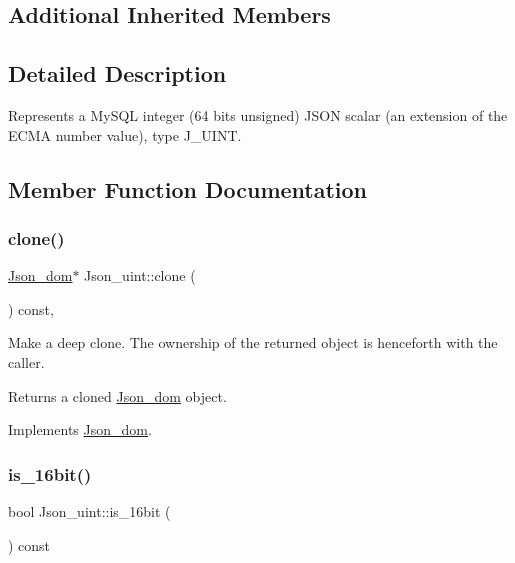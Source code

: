 \subsection*{Additional Inherited Members}


\subsection{Detailed Description}
Represents a My\+S\+QL integer (64 bits unsigned) J\+S\+ON scalar (an extension of the E\+C\+MA number value), type J\+\_\+\+U\+I\+NT. 

\subsection{Member Function Documentation}
\mbox{\label{classJson__uint_acdc931eba3b28293ca6e16d698732d42}} 
\subsubsection{\texorpdfstring{clone()}{clone()}}
{\footnotesize\ttfamily \mbox{\hyperlink{classJson__dom}{Json\+\_\+dom}}$\ast$ Json\+\_\+uint\+::clone (\begin{DoxyParamCaption}{ }\end{DoxyParamCaption}) const\hspace{0.3cm}{\ttfamily [inline]}, {\ttfamily [virtual]}}

Make a deep clone. The ownership of the returned object is henceforth with the caller.

\begin{DoxyReturn}{Returns}
a cloned \mbox{\hyperlink{classJson__dom}{Json\+\_\+dom}} object. 
\end{DoxyReturn}


Implements \mbox{\hyperlink{classJson__dom_a03c529d590cc4cdb747ccb82f4b70fb5}{Json\+\_\+dom}}.

\mbox{\label{classJson__uint_a800710255a621f78f3bae3f066e8a1ec}} 
\subsubsection{\texorpdfstring{is\+\_\+16bit()}{is\_16bit()}}
{\footnotesize\ttfamily bool Json\+\_\+uint\+::is\+\_\+16bit (\begin{DoxyParamCaption}{ }\end{DoxyParamCaption}) const\hspace{0.3cm}{\ttfamily [inline]}}

